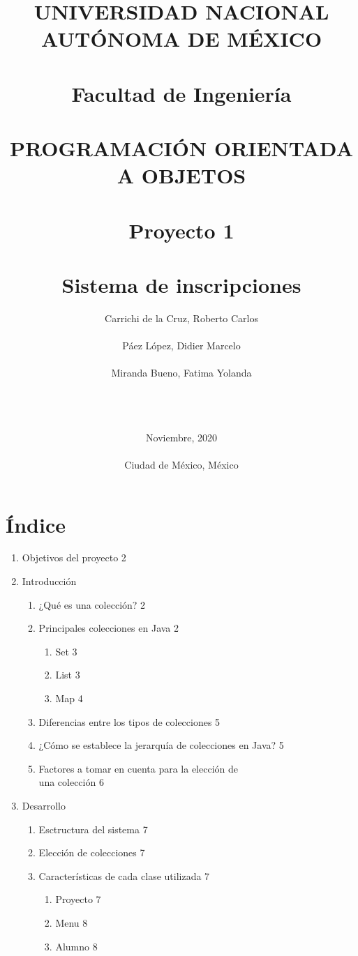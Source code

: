 \documentclass[12pt]{report}
\title{UNIVERSIDAD NACIONAL AUTÓNOMA DE MÉXICO\\ \ \\Facultad de Ingeniería\\ \ \\PROGRAMACIÓN ORIENTADA A OBJETOS\\ \ \\Proyecto 1 \\ \ \\Sistema de inscripciones \\}
\author{Carrichi de la Cruz, Roberto Carlos\\ \ \\Páez López, Didier Marcelo\\ \ \\Miranda Bueno, Fatima Yolanda \\ \ \\ \ \\ \ \\}
\date{Noviembre, 2020\\ \ \\Ciudad de México, México}
\begin{document}
\maketitle %



\section*{Índice}
\begin{enumerate}
    \item Objetivos del proyecto \hfill 2
    \item Introducción
    \begin{enumerate}
        \item ¿Qué es una colección? \hfill 2
        \item Principales colecciones en Java \hfill 2
        \begin{enumerate}
            \item Set \hfill 3
            \item List \hfill 3
            \item Map \hfill 4
        \end{enumerate}
        \item Diferencias entre los tipos de colecciones \hfill 5
        \item ¿Cómo se establece la jerarquía de colecciones en Java? \hfill 5
        \item Factores a tomar en cuenta para la elección de \\una colección \hfill 6
    \end{enumerate}
    \item Desarrollo
    \begin{enumerate}
        \item Esctructura del sistema \hfill 7
        \item Elección de colecciones \hfill 7
        \item Características de cada clase utilizada \hfill 7
        \begin{enumerate}
            \item Proyecto \hfill 7
            \item Menu \hfill 8
            \item Alumno \hfill 8

\end{enumerate}
\end{enumerate}
\end{enumerate}
\end{document}
